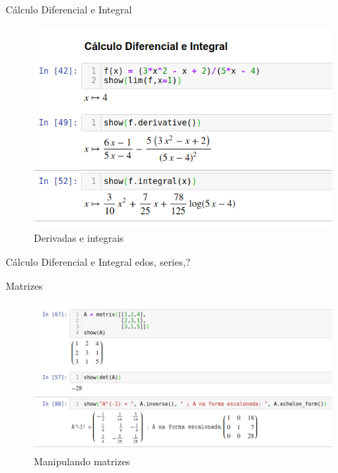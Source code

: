 \documentclass[12pt]{beamer}
\begin{document}
\begin{frame}
  {Cálculo Diferencial e Integral}
  \begin{figure}[h]
    \centering
    \includegraphics[scale=0.4]{img/calculo01.png}
    \caption{Derivadas e integrais}
    \label{img:derivint}
  \end{figure}
\end{frame}


\begin{frame}
  {Cálculo Diferencial e Integral}
  edos, series,?
\end{frame}


\begin{frame}
  {Matrizes}
  \begin{figure}[h]
    \centering
    \includegraphics[scale=0.4]{img/matrizes01.png}
    \caption{Manipulando matrizes}
    \label{img:manipmatriz}
  \end{figure}
\end{frame}
\end{document}
